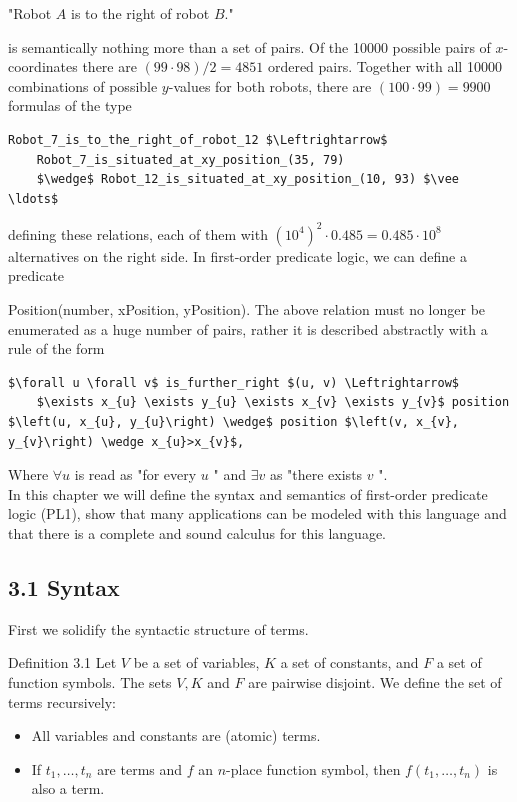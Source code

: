 \documentclass[10pt]{article}
\begin{document}
\begin{displayquote}
"Robot $A$ is to the right of robot $B$."
\end{displayquote}

is semantically nothing more than a set of pairs. Of the 10000 possible pairs of $x$-coordinates there are $(99 \cdot 98) / 2=4851$ ordered pairs. Together with all 10000 combinations of possible $y$-values for both robots, there are $(100 \cdot 99)=9900$ formulas of the type

\begin{verbatim}
Robot_7_is_to_the_right_of_robot_12 $\Leftrightarrow$
    Robot_7_is_situated_at_xy_position_(35, 79)
    $\wedge$ Robot_12_is_situated_at_xy_position_(10, 93) $\vee \ldots$
\end{verbatim}

defining these relations, each of them with $\left(10^{4}\right)^{2} \cdot 0.485=0.485 \cdot 10^{8}$ alternatives on the right side. In first-order predicate logic, we can define a predicate

Position(number, xPosition, yPosition). The above relation must no longer be enumerated as a huge number of pairs, rather it is described abstractly with a rule of the form

\begin{verbatim}
$\forall u \forall v$ is_further_right $(u, v) \Leftrightarrow$
    $\exists x_{u} \exists y_{u} \exists x_{v} \exists y_{v}$ position $\left(u, x_{u}, y_{u}\right) \wedge$ position $\left(v, x_{v}, y_{v}\right) \wedge x_{u}>x_{v}$,
\end{verbatim}

Where $\forall u$ is read as "for every $u$ " and $\exists v$ as "there exists $v$ ".\\
In this chapter we will define the syntax and semantics of first-order predicate logic (PL1), show that many applications can be modeled with this language and that there is a complete and sound calculus for this language.

\subsection*{3.1 Syntax}
First we solidify the syntactic structure of terms.

Definition 3.1 Let $V$ be a set of variables, $K$ a set of constants, and $F$ a set of function symbols. The sets $V, K$ and $F$ are pairwise disjoint. We define the set of terms recursively:

\begin{itemize}
  \item All variables and constants are (atomic) terms.
  \item If $t_{1}, \ldots, t_{n}$ are terms and $f$ an $n$-place function symbol, then $f\left(t_{1}, \ldots, t_{n}\right)$ is also a term.
\end{itemize}
\end{document}
